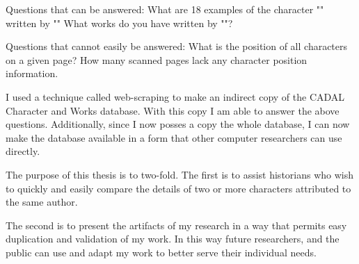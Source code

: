     Questions that can be answered:
        What are 18 examples of the character "" written by ""
        What works do you have written by ""?
    
    Questions that cannot easily be answered:
        What is the position of all characters on a given page?
        How many scanned pages lack any character position information.


I used a technique called web-scraping to make an indirect copy of the CADAL Character and Works database.  With this copy I am able to answer the above questions.  Additionally, since I now posses a copy the whole database, I can now make the database available in a form that other computer researchers can use directly.


The purpose of this thesis is to two-fold.  The first is to assist historians who wish to quickly and easily compare the details of two or more characters attributed to the same author.

The second is to present the artifacts of my research in a way that permits easy duplication and validation of my work.  In this way future researchers, and the public can use and adapt my work to better serve their individual needs.






